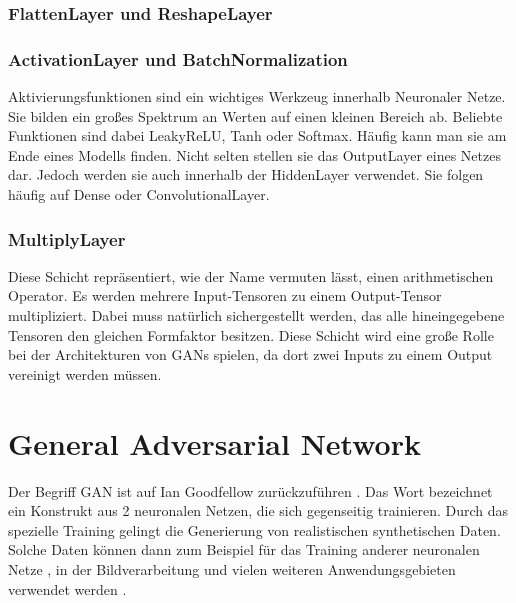 \subsubsection{FlattenLayer und ReshapeLayer} 

\subsubsection{ActivationLayer und BatchNormalization}
Aktivierungsfunktionen sind ein wichtiges Werkzeug innerhalb Neuronaler Netze.
Sie bilden ein großes Spektrum an Werten auf einen kleinen Bereich ab.
Beliebte Funktionen sind dabei LeakyReLU, Tanh oder Softmax.
Häufig kann man sie am Ende eines Modells finden.
Nicht selten stellen sie das OutputLayer eines Netzes dar.
Jedoch werden sie auch innerhalb der HiddenLayer verwendet.
Sie folgen häufig auf Dense oder ConvolutionalLayer.
\newline





\subsubsection{MultiplyLayer}
Diese Schicht repräsentiert, wie der Name vermuten lässt, einen arithmetischen Operator.
Es werden mehrere Input-Tensoren zu einem Output-Tensor multipliziert.
Dabei muss natürlich sichergestellt werden, das alle hineingegebene Tensoren den gleichen Formfaktor besitzen.
Diese Schicht wird eine große Rolle bei der Architekturen von GANs spielen, da dort zwei Inputs zu einem Output vereinigt werden müssen.

\section{General Adversarial Network}
Der Begriff \acrfull{GAN} ist auf Ian Goodfellow zurückzuführen \cite{gan-original-paper}.
Das Wort bezeichnet ein Konstrukt aus 2 neuronalen Netzen, die sich gegenseitig trainieren.
Durch das spezielle Training gelingt die Generierung von realistischen synthetischen Daten.
Solche Daten können dann zum Beispiel für das Training anderer neuronalen Netze \cite{gan-application-augmenting-training-data}, in der Bildverarbeitung \cite{gan-application-upscaling, gan-application-blending} und vielen weiteren Anwendungsgebieten verwendet werden \cite{gan-application-dna-optimizes-protein-functions, gan-application-audio-synthesis}.

